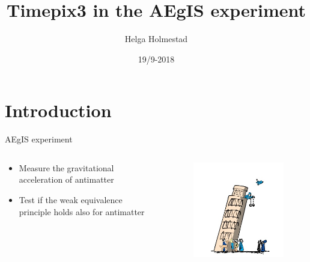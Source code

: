 \documentclass{beamer}
\title[]{Timepix3 in the AEgIS experiment}
\author{Helga Holmestad}
\institute{University of Oslo}
\date{19/9-2018}
\begin{document}
\begin{frame}
  \titlepage
\end{frame}


\section{Introduction}

\begin{frame}{\centering AEgIS experiment}
  \begin{columns}
    \begin{column}{0.5\textwidth}
      \begin{itemize}
      \item{Measure the gravitational acceleration of antimatter}
      \item{Test if the  weak equivalence principle holds also for antimatter}
      \end{itemize}
     \end{column}
    \begin{column}{0.5\textwidth}
      \begin{figure}
        \includegraphics[width=\textwidth]{fig/gali3.jpg}
        \end{figure}
    \end{column}
  \end{columns}
  



  

\end{frame}
\end{document}
